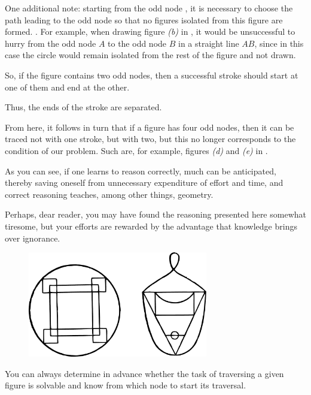 One additional note: starting from the odd node , it is necessary to choose the path leading to the odd node  so that no figures isolated from this figure are formed. . For example, when drawing figure \emph{(b)} in , it would be unsuccessful to hurry from the odd node $A$ to the odd node $B$ in a straight line $AB$, since in this case the circle would remain isolated from the rest of the figure and not drawn.

So, if the figure contains two odd nodes, then a successful stroke should start at one of them and end at the other.

Thus, the ends of the stroke are separated.

From here, it follows in turn that if a figure has four odd nodes, then it can be traced not with one stroke, but with two, but this no longer corresponds to the condition of our problem. Such are, for example, figures \emph{(d)} and \emph{(e)} in .

As you can see, if one learns to reason correctly, much can be anticipated, thereby saving oneself from unnecessary expenditure of effort and time, and correct reasoning teaches, among other things, geometry.

Perhaps, dear reader, you may have found the reasoning presented here somewhat tiresome, but your efforts are rewarded by the advantage that knowledge brings over ignorance.

\begin{figure}[h!]
\centering
\includegraphics[width=0.7\textwidth]{figures/ch-10/fig-156.pdf}
\end{figure}


You can always determine in advance whether the task of traversing a given figure is solvable and know from which node to start its traversal.

